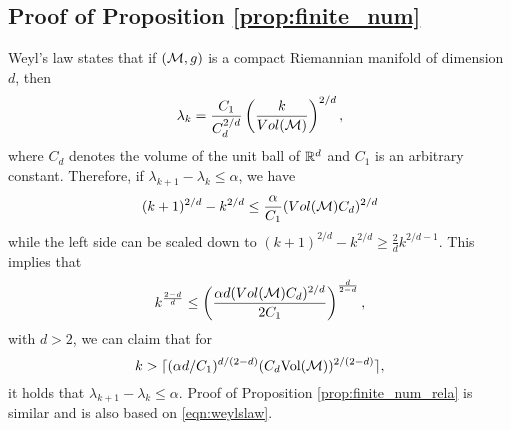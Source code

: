 \setcounter{subsection}{0}
\subsection{Proof of Proposition \ref{prop:finite_num}}
Weyl's law \cite[Chapter~1]{arendt2009mathematical} states that if $({\mathcal M}, g)$ is a compact Riemannian manifold of dimension $d$, then 
\begin{equation}\label{eqn:weylslaw}
\lambda_k = \frac{C_1}{C_d^{2/d}}\left(\frac{k}{Vol({\mathcal M})} \right)^{2/d},
\end{equation}
where $C_d$ denotes the volume of the unit ball of ${\mathbb R}^d$ and $C_1$ is an arbitrary constant. Therefore, if $\lambda_{k+1}-\lambda_k\leq \alpha$, we have
\begin{align}
    (k+1)^{2/d}-k^{2/d}\leq \frac{\alpha}{C_1} (Vol({\mathcal M}) C_d)^{2/d}
\end{align}
while the left side can be scaled down to $(k+1)^{2/d}-k^{2/d}\geq \frac{2}{d}k^{2/d-1}$. This implies that 
\begin{align}
    k^{\frac{2-d}{d}}\leq \left( \frac{\alpha d (Vol({\mathcal M}) C_d)^{2/d}}{2C_1} \right)^{\frac{d}{2-d}},
\end{align}
with $d>2$, we can claim that for 
$$k> \lceil (\alpha d/C_1)^{d/(2-d)}(C_d \text{Vol}({\mathcal M}))^{2/(2-d)} \rceil,$$ it holds that $\lambda_{k+1}-\lambda_k\leq \alpha$. Proof of Proposition \ref{prop:finite_num_rela} is similar and is also based on \eqref{eqn:weylslaw}.

